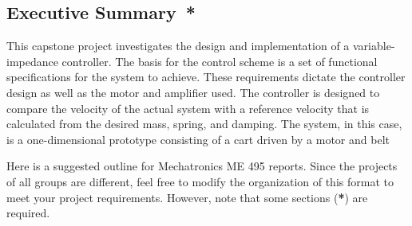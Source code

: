 \subsection*{Executive Summary{{\color{red}\ *}}}

This capstone project investigates the design and implementation of a variable-impedance controller. The basis for the control scheme is a set of functional specifications for the system to achieve. These requirements dictate the controller design as well as the motor and amplifier used. The controller is designed to compare the velocity of the actual system with a reference velocity that is calculated from the desired mass, spring, and damping.  The system, in this case, is a one-dimensional prototype consisting of a cart driven by a motor and belt 

Here is a suggested outline for Mechatronics ME 495 reports. Since the projects of all groups are different, feel free to modify the organization of this format to meet your project requirements. However, note that some sections ({\color{red}\bf{*}}) are required. 
